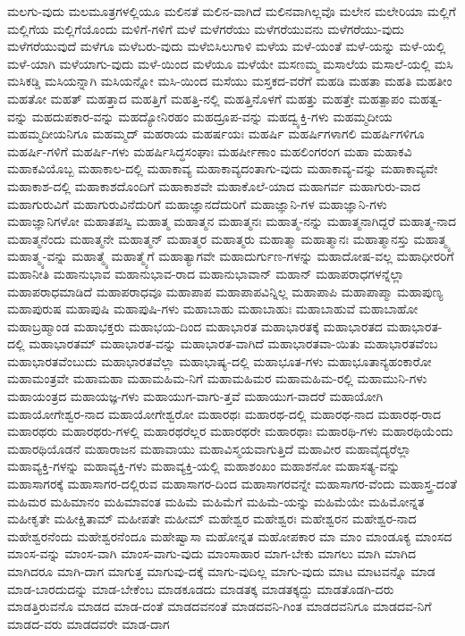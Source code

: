 {ಮಲಗು-ವುದು
ಮಲಮೂತ್ರಗಳಲ್ಲಿಯೂ
ಮಲಿನತೆ
ಮಲಿನ-ವಾಗಿದೆ
ಮಲಿನವಾಗಿಲ್ಲವೊ
ಮಲೇನ
ಮಲೇರಿಯಾ
ಮಲ್ಲಿಗೆ
ಮಲ್ಲಿಗೆಯ
ಮಲ್ಲಿಗೆಯೊಂದು
ಮಳಿಗೆ-ಗಳಿಗೆ
ಮಳೆ
ಮಳೆಗರೆಯು
ಮಳೆಗರೆಯುವನು
ಮಳೆಗರೆಯು-ವುದು
ಮಳೆಗರೆಯುವುದೆ
ಮಳೆಗೂ
ಮಳೆಬರು-ವುದು
ಮಳೆಬಿಸಿಲುಗಾಳಿ
ಮಳೆಯ
ಮಳೆ-ಯಂತೆ
ಮಳೆ-ಯನ್ನು
ಮಳೆ-ಯಲ್ಲಿ
ಮಳೆ-ಯಾಗಿ
ಮಳೆಯಾಗು-ವುದು
ಮಳೆ-ಯಿಂದ
ಮಳೆಯೂ
ಮಳೆಯೇ
ಮಸಣಮ್ಮ
ಮಸಾಲೆಯ
ಮಸಾಲೆ-ಯಲ್ಲಿ
ಮಸಿ
ಮಸಿಕಡ್ಡಿ
ಮಸಿಯನ್ನಾಗಿ
ಮಸಿಯನ್ನೋ
ಮಸಿ-ಯಿಂದ
ಮಸೆಯು
ಮಸ್ತಕದ-ವರೆಗೆ
ಮಹಡಿ
ಮಹತಾ
ಮಹತಿ
ಮಹತೀಂ
ಮಹತೋ
ಮಹತ್
ಮಹತ್ತಾದ
ಮಹತ್ತಿಗೆ
ಮಹತ್ತಿ-ನಲ್ಲಿ
ಮಹತ್ತಿನೊಳಗೆ
ಮಹತ್ತು
ಮಹತ್ತೇ
ಮಹತ್ಪಾಪಂ
ಮಹತ್ವ-ವನ್ನು
ಮಹದುಪಕಾರ-ವನ್ನು
ಮಹದ್ಯೋನಿರಹಂ
ಮಹದ್ರೂಪ-ವನ್ನು
ಮಹದ್ವ್ಯಕ್ತಿ-ಗಳು
ಮಹಮ್ಮದೀಯ
ಮಹಮ್ಮದೀಯನಿಗೂ
ಮಹಮ್ಮದ್
ಮಹರಾಯ
ಮಹರ್ಷಯಃ
ಮಹರ್ಷಿ
ಮಹರ್ಷಿಗಳಾಗಲಿ
ಮಹರ್ಷಿಗಳಿಗೂ
ಮಹರ್ಷಿ-ಗಳಿಗೆ
ಮಹರ್ಷಿ-ಗಳು
ಮಹರ್ಷಿಸಿದ್ಧಸಂಘಾಃ
ಮಹರ್ಷೀಣಾಂ
ಮಹಲಿಂಗರಂಗ
ಮಹಾ
ಮಹಾಕವಿ
ಮಹಾಕವಿಯೊಬ್ಬ
ಮಹಾಕಾಲ-ದಲ್ಲಿ
ಮಹಾಕಾವ್ಯ
ಮಹಾಕಾವ್ಯದಂತಾಗು-ವುದು
ಮಹಾಕಾವ್ಯ-ವನ್ನು
ಮಹಾಕಾವ್ಯವೇ
ಮಹಾಕಾಶ-ದಲ್ಲಿ
ಮಹಾಕಾಶದೊಂದಿಗೆ
ಮಹಾಕಾಶವೇ
ಮಹಾಕೊಲೆ-ಯಾದ
ಮಹಾಗರ್ವ
ಮಹಾಗುರು-ವಾದ
ಮಹಾಗುರುವಿಗೆ
ಮಹಾಗುರುವಿನೆದುರಿಗೆ
ಮಹಾಜ್ಞಾನದೆದುರಿಗೆ
ಮಹಾಜ್ಞಾನಿ-ಗಳ
ಮಹಾಜ್ಞಾನಿ-ಗಳು
ಮಹಾಜ್ಞಾನಿಗಳೋ
ಮಹಾತಪಸ್ವಿ
ಮಹಾತ್ಮ
ಮಹಾತ್ಮನ
ಮಹಾತ್ಮನಃ
ಮಹಾತ್ಮ-ನನ್ನು
ಮಹಾತ್ಮನಾಗಿದ್ದರೆ
ಮಹಾತ್ಮ-ನಾದ
ಮಹಾತ್ಮನೆಂದು
ಮಹಾತ್ಮನೇ
ಮಹಾತ್ಮನ್
ಮಹಾತ್ಮರ
ಮಹಾತ್ಮರು
ಮಹಾತ್ಮಾ
ಮಹಾತ್ಮಾನಃ
ಮಹಾತ್ಮಾನಸ್ತು
ಮಹಾತ್ಮ್ಯ
ಮಹಾತ್ಮ್ಯ-ವನ್ನು
ಮಹಾತ್ಮ್ಯೆ
ಮಹಾತ್ಮ್ಯೆಗೆ
ಮಹಾತ್ಯಾಗವೇ
ಮಹಾದುರ್ಗುಣ-ಗಳನ್ನು
ಮಹಾದೋಷ-ವಲ್ಲ
ಮಹಾಧೀರರಿಗೆ
ಮಹಾನೀತಿ
ಮಹಾನುಭಾವ
ಮಹಾನುಭಾವ-ರಾದ
ಮಹಾನುಭಾವಾನ್
ಮಹಾನ್
ಮಹಾಪರಾಧಗಳನ್ನೆಲ್ಲಾ
ಮಹಾಪರಾಧಮಾಡಿದೆ
ಮಹಾಪರಾಧವೂ
ಮಹಾಪಾಪ
ಮಹಾಪಾಪವಿನ್ನಿಲ್ಲ
ಮಹಾಪಾಪಿ
ಮಹಾಪಾಪ್ಮಾ
ಮಹಾಪುಣ್ಯ
ಮಹಾಪುರುಷ
ಮಹಾಪುಷಿ
ಮಹಾಪುಷಿ-ಗಳು
ಮಹಾಬಾಹು
ಮಹಾಬಾಹುಃ
ಮಹಾಬಾಹುವೆ
ಮಹಾಬಾಹೋ
ಮಹಾಬ್ರಹ್ಮಾಂಡ
ಮಹಾಭಕ್ತರು
ಮಹಾಭಯ-ದಿಂದ
ಮಹಾಭಾರತ
ಮಹಾಭಾರತಕ್ಕೆ
ಮಹಾಭಾರತದ
ಮಹಾಭಾರತ-ದಲ್ಲಿ
ಮಹಾಭಾರತಮ್
ಮಹಾಭಾರತ-ವನ್ನು
ಮಹಾಭಾರತ-ವಾಗಿದೆ
ಮಹಾಭಾರತವಾ-ಯಿತು
ಮಹಾಭಾರತವೆಂಬ
ಮಹಾಭಾರತವೆಂಬುದು
ಮಹಾಭಾರತವೆಲ್ಲಾ
ಮಹಾಭಾಷ್ಯ-ದಲ್ಲಿ
ಮಹಾಭೂತ-ಗಳು
ಮಹಾಭೂತಾನ್ಯಹಂಕಾರೋ
ಮಹಾಮಂತ್ರವೇ
ಮಹಾಮಹಾ
ಮಹಾಮಹಿಮ-ನಿಗೆ
ಮಹಾಮಹಿಮರ
ಮಹಾಮಹಿಮ-ರಲ್ಲಿ
ಮಹಾಮುನಿ-ಗಳು
ಮಹಾಯಂತ್ರದ
ಮಹಾಯಜ್ಞ-ಗಳು
ಮಹಾಯುಗ-ವಾಗು-ತ್ತವೆ
ಮಹಾಯುಗ-ವಾದರೆ
ಮಹಾಯೋಗಿ
ಮಹಾಯೋಗೇಶ್ವರ-ನಾದ
ಮಹಾಯೋಗೇಶ್ವರೋ
ಮಹಾರಥಃ
ಮಹಾರಥ-ದಲ್ಲಿ
ಮಹಾರಥ-ನಾದ
ಮಹಾರಥ-ರಾದ
ಮಹಾರಥರು
ಮಹಾರಥರು-ಗಳಲ್ಲಿ
ಮಹಾರಥರೆಲ್ಲರ
ಮಹಾರಥರೇ
ಮಹಾರಥಾಃ
ಮಹಾರಥಿ-ಗಳು
ಮಹಾರಥಿಯೆಂದು
ಮಹಾರಥಿಯೊಡನೆ
ಮಹಾರಾಜನ
ಮಹಾವಾಯು
ಮಹಾವಿಸ್ಮಯವಾಗುತ್ತಿದೆ
ಮಹಾವೀರ
ಮಹಾವೈದ್ಯರೆಲ್ಲಾ
ಮಹಾವ್ಯಕ್ತಿ-ಗಳನ್ನು
ಮಹಾವ್ಯಕ್ತಿ-ಗಳು
ಮಹಾವ್ಯಕ್ತಿ-ಯಲ್ಲಿ
ಮಹಾಶಂಖಂ
ಮಹಾಶನೋ
ಮಹಾಸತ್ಯ-ವನ್ನು
ಮಹಾಸಾಗರಕ್ಕೆ
ಮಹಾಸಾಗರ-ದಲ್ಲಿರುವ
ಮಹಾಸಾಗರ-ದಿಂದ
ಮಹಾಸಾಗರವನ್ನೇ
ಮಹಾಸಾಗರ-ವೆಂದು
ಮಹಾಸ್ತ್ರ-ದಂತೆ
ಮಹಿಮರ
ಮಹಿಮಾನಂ
ಮಹಿಮಾವಂತ
ಮಹಿಮೆ
ಮಹಿಮೆಗೆ
ಮಹಿಮೆ-ಯನ್ನು
ಮಹಿಮೆಯೇ
ಮಹಿಮೋನ್ನತ
ಮಹೀಕೃತೇ
ಮಹೀಕ್ಷಿತಾಮ್
ಮಹೀಪತೇ
ಮಹೀಮ್
ಮಹೇಶ್ವರ
ಮಹೇಶ್ವರಃ
ಮಹೇಶ್ವರನ
ಮಹೇಶ್ವರ-ನಾದ
ಮಹೇಶ್ವರನೆಂದು
ಮಹೇಶ್ವರನೆಂದೂ
ಮಹೇಷ್ವಾಸಾ
ಮಹೋನ್ನತ
ಮಹೋಪಕಾರ
ಮಾ
ಮಾಂ
ಮಾಂಡೂಕ್ಯ
ಮಾಂಸದ
ಮಾಂಸ-ವನ್ನು
ಮಾಂಸ-ವಾಗಿ
ಮಾಂಸ-ವಾಗು-ವುದು
ಮಾಂಸಾಹಾರ
ಮಾಗ-ಬೇಕು
ಮಾಗಲು
ಮಾಗಿ
ಮಾಗಿದ
ಮಾಗಿದರೂ
ಮಾಗಿ-ದಾಗ
ಮಾಗುತ್ತ
ಮಾಗುವು-ದಕ್ಕೆ
ಮಾಗು-ವುದಿಲ್ಲ
ಮಾಗು-ವುದು
ಮಾಟ
ಮಾಟವನ್ನೊ
ಮಾಡ
ಮಾಡ-ಬಾರದುದನ್ನು
ಮಾಡ-ಬೇಕೆಂಬ
ಮಾಡಕೂಡದು
ಮಾಡತಕ್ಕ
ಮಾಡತಕ್ಕದ್ದು
ಮಾಡತೊಡಗಿ-ದರು
ಮಾಡತ್ತಿರುವನೊ
ಮಾಡದ
ಮಾಡ-ದಂತೆ
ಮಾಡದವನಂತೆ
ಮಾಡದವನಿ-ಗಿಂತ
ಮಾಡದವನಿಗೂ
ಮಾಡದವ-ನಿಗೆ
ಮಾಡದ-ವರು
ಮಾಡದವರೇ
ಮಾಡ-ದಾಗ
}

